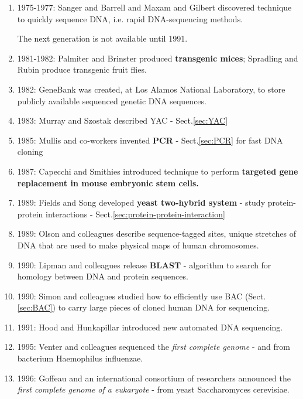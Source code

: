 \begin{enumerate}
  \item 1975-1977: Sanger and Barrell and Maxam and Gilbert discovered technique
  to quickly sequence DNA, i.e. rapid DNA-sequencing methods.
  
  The next generation is not available until 1991.
  
  \item 1981-1982: Palmiter and Brinster produced {\bf transgenic mices};
  Spradling and Rubin produce transgenic fruit flies.
  
  \item 1982: GeneBank was created, at  Los Alamos National Laboratory, to store 
  publicly available sequenced genetic DNA sequences.
  
  \item 1983: Murray and Szostak described YAC - Sect.\ref{sec:YAC}
  
  \item 1985: Mullis and co-workers invented {\bf PCR} - Sect.\ref{sec:PCR} 
  for fast DNA cloning
  
  \item 1987: Capecchi and Smithies introduced technique to perform {\bf
  targeted gene replacement in mouse embryonic stem cells.}
  
  \item 1989: Fields and Song developed {\bf yeast two-hybrid system} - study
  protein-protein interactions - Sect.\ref{sec:protein-protein-interaction}
  
  
  \item 1989: Olson and colleagues describe sequence-tagged sites, unique
  stretches of DNA that are used to make physical maps of human chromosomes.
  
  \item 1990: Lipman and colleagues release {\bf BLAST} - algorithm to  search
  for homology between DNA and protein sequences.
  
  \item 1990: Simon and colleagues studied how to efficiently use BAC
  (Sect.\ref{sec:BAC}) to carry large pieces of cloned human DNA for sequencing.
  
  \item 1991: Hood and Hunkapillar introduced new automated DNA sequencing.
  
  \item 1995: Venter and colleagues sequenced the {\it first complete genome} -
  and from bacterium Haemophilus influenzae.
  
  \item 1996: Goffeau and an international consortium of researchers announced
  the {\it first complete genome of a eukaryote} - from yeast Saccharomyces
  cerevisiae.
  

\end{enumerate}
